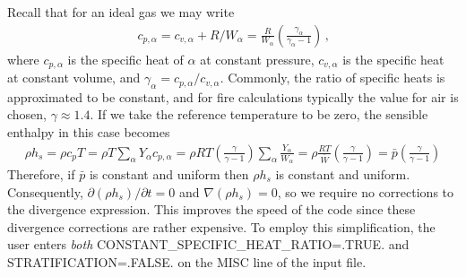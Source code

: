 Recall that for an ideal gas we may write
\begin{align}
c_{p,\alpha} = c_{v,\alpha} + R/W_\alpha = \frac{R}{W_\alpha} \left(\frac{\gamma_\alpha}{\gamma_\alpha-1}\right) \,\mbox{,}
\end{align}
where $c_{p,\alpha}$ is the specific heat of $\alpha$ at constant pressure, $c_{v,\alpha}$ is the specific heat at constant volume, and $\gamma_\alpha = c_{p,\alpha}/c_{v,\alpha}$.  Commonly, the ratio of specific heats is approximated to be constant, and for fire calculations typically the value for air is chosen, $\gamma \approx 1.4$.  If we take the reference temperature to be zero, the sensible enthalpy in this case becomes
\begin{align}
\rho h_s = \rho c_p T = \rho T \sum_\alpha Y_\alpha c_{p,\alpha} = \rho R T \left(\frac{\gamma}{\gamma-1}\right)\sum_\alpha \frac{Y_\alpha}{W_\alpha} = \rho \frac{R T}{\overline{W}} \left(\frac{\gamma}{\gamma-1}\right) = \bar{p}\left(\frac{\gamma}{\gamma-1}\right)
\end{align}
Therefore, if $\bar{p}$ is constant and uniform then $\rho h_s$ is constant and uniform.  Consequently, $\partial (\rho h_s)/\partial t = 0$ and $\nabla (\rho h_s) = 0$, so we require no corrections to the divergence expression.  This improves the speed of the code since these divergence corrections are rather expensive.  To employ this simplification, the user enters \emph{both} {\ct CONSTANT\_SPECIFIC\_HEAT\_RATIO=.TRUE.} and {\ct STRATIFICATION=.FALSE.} on the {\ct MISC} line of the input file.


